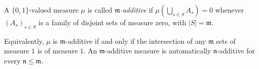 A $\{0,1\}$-valued measure $\mu$ is called \emph{$\mathfrak{m}$-additive} if $\mu(\bigcup_{s \in S} A_s) = 0$ whenever $(A_s)_{s \in S}$ is a family of disjoint sets of measure zero, with $|S| = \mathfrak{m}$.

Equivalently, $\mu$ is $\mathfrak{m}$-additive if and only if the intersection of any $\mathfrak{m}$ sets of measure $1$ is of measure $1$. An $\mathfrak{m}$-additive measure is automatically $\mathfrak{n}$-additive for every $\mathfrak{n} \leq \mathfrak{m}$.